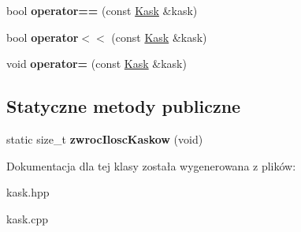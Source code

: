 \begin{DoxyCompactItemize}
\item 
\mbox{\label{class_kask_abb8614360e4958220a4f779faac7393a}} 
bool {\bfseries operator==} (const \hyperlink{class_kask}{Kask} \&kask)
\item 
\mbox{\label{class_kask_a429e0cf2f819de1b68b9a57f4760ca80}} 
bool {\bfseries operator$<$$<$} (const \hyperlink{class_kask}{Kask} \&kask)
\item 
\mbox{\label{class_kask_a49180364c9192e95934c67b9360b2c87}} 
void {\bfseries operator=} (const \hyperlink{class_kask}{Kask} \&kask)
\end{DoxyCompactItemize}
\subsection*{Statyczne metody publiczne}
\begin{DoxyCompactItemize}
\item 
\mbox{\label{class_kask_aaaadafb0131fe2381d4e71696145734c}} 
static size\+\_\+t {\bfseries zwroc\+Ilosc\+Kaskow} (void)
\end{DoxyCompactItemize}


Dokumentacja dla tej klasy została wygenerowana z plików\+:\begin{DoxyCompactItemize}
\item 
kask.\+hpp\item 
kask.\+cpp\end{DoxyCompactItemize}

